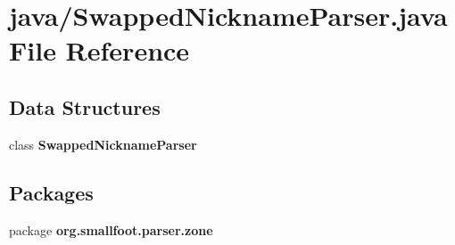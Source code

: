 \section{java/\+Swapped\+Nickname\+Parser.java File Reference}
\label{SwappedNicknameParser_8java}
\subsection*{Data Structures}
\begin{DoxyCompactItemize}
\item 
class {\bf Swapped\+Nickname\+Parser}
\end{DoxyCompactItemize}
\subsection*{Packages}
\begin{DoxyCompactItemize}
\item 
package {\bf org.\+smallfoot.\+parser.\+zone}
\end{DoxyCompactItemize}
